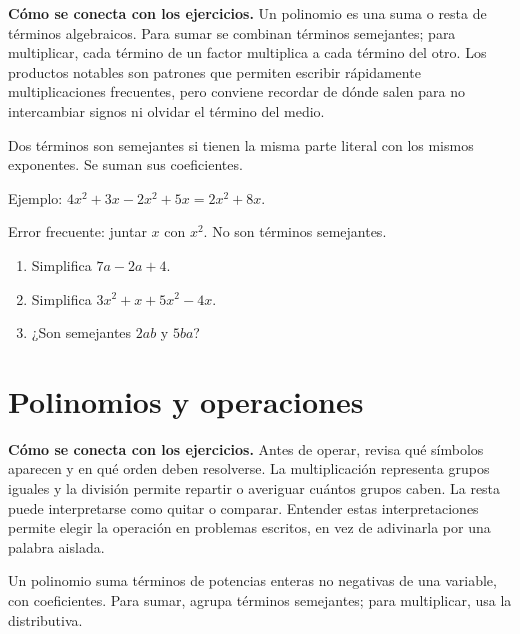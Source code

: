 \documentclass[10pt,oneside,openany]{book}
\begin{document}
\textbf{Cómo se conecta con los ejercicios.} Un polinomio es una suma o resta de términos algebraicos. Para sumar se combinan términos semejantes; para multiplicar, cada término de un factor multiplica a cada término del otro. Los productos notables son patrones que permiten escribir rápidamente multiplicaciones frecuentes, pero conviene recordar de dónde salen para no intercambiar signos ni olvidar el término del medio.

Dos términos son semejantes si tienen la misma parte literal con los mismos exponentes. Se suman sus coeficientes.

\begin{ejemplo}
Ejemplo: $4x^2+3x-2x^2+5x=2x^2+8x$.
\end{ejemplo}

\begin{ojo}
Error frecuente: juntar $x$ con $x^2$. No son términos semejantes.
\end{ojo}

\begin{practica}

\begin{enumerate}

\item Simplifica $7a-2a+4$.

\item Simplifica $3x^2+x+5x^2-4x$.

\item ¿Son semejantes $2ab$ y $5ba$?

\end{enumerate}

\end{practica}



\section{Polinomios y operaciones}

\textbf{Cómo se conecta con los ejercicios.} Antes de operar, revisa qué símbolos aparecen y en qué orden deben resolverse. La multiplicación representa grupos iguales y la división permite repartir o averiguar cuántos grupos caben. La resta puede interpretarse como quitar o comparar. Entender estas interpretaciones permite elegir la operación en problemas escritos, en vez de adivinarla por una palabra aislada.

Un polinomio suma términos de potencias enteras no negativas de una variable, con coeficientes. Para sumar, agrupa términos semejantes; para multiplicar, usa la distributiva.
\end{document}
